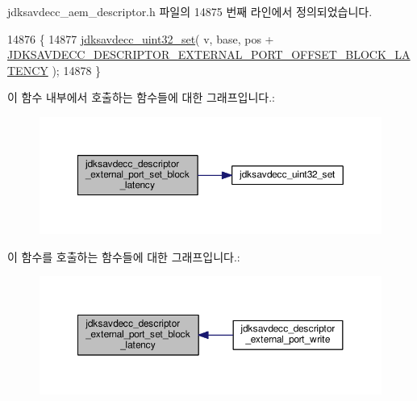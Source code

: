 jdksavdecc\+\_\+aem\+\_\+descriptor.\+h 파일의 14875 번째 라인에서 정의되었습니다.


\begin{DoxyCode}
14876 \{
14877     \hyperlink{group__endian_ga59b24ae6f7f47ca4d24ea337543162bf}{jdksavdecc\_uint32\_set}( v, base, pos + 
      \hyperlink{group__descriptor__external__port_gabecb7dc4c4398be42046ac10cfabb3ac}{JDKSAVDECC\_DESCRIPTOR\_EXTERNAL\_PORT\_OFFSET\_BLOCK\_LATENCY}
       );
14878 \}
\end{DoxyCode}


이 함수 내부에서 호출하는 함수들에 대한 그래프입니다.\+:
\nopagebreak
\begin{figure}[H]
\begin{center}
\leavevmode
\includegraphics[width=350pt]{group__descriptor__external__port_ga684eaa4ea1864fd15c1ddd496bf52a5b_cgraph}
\end{center}
\end{figure}




이 함수를 호출하는 함수들에 대한 그래프입니다.\+:
\nopagebreak
\begin{figure}[H]
\begin{center}
\leavevmode
\includegraphics[width=350pt]{group__descriptor__external__port_ga684eaa4ea1864fd15c1ddd496bf52a5b_icgraph}
\end{center}
\end{figure}


